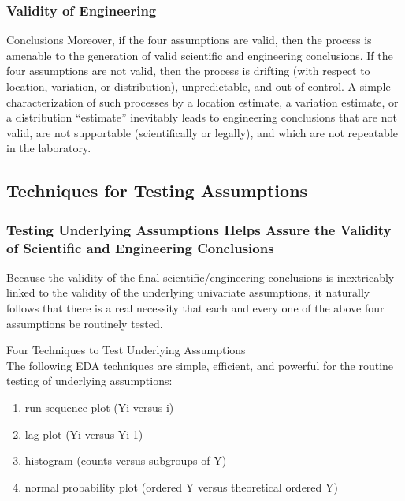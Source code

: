 \documentclass[]{book}
\providecommand{\tightlist}{%
  \setlength{\itemsep}{0pt}\setlength{\parskip}{0pt}}
\theoremstyle{definition}
\theoremstyle{definition}
\theoremstyle{definition}
\theoremstyle{remark}
\begin{document}
\subsubsection{Validity of Engineering}\label{validity-of-engineering}

Conclusions Moreover, if the four assumptions are valid, then the
process is amenable to the generation of valid scientific and
engineering conclusions. If the four assumptions are not valid, then the
process is drifting (with respect to location, variation, or
distribution), unpredictable, and out of control. A simple
characterization of such processes by a location estimate, a variation
estimate, or a distribution ``estimate'' inevitably leads to engineering
conclusions that are not valid, are not supportable (scientifically or
legally), and which are not repeatable in the laboratory.

\subsection{Techniques for Testing
Assumptions}\label{techniques-for-testing-assumptions}

\subsubsection{Testing Underlying Assumptions Helps Assure the Validity
of Scientific and Engineering
Conclusions}\label{testing-underlying-assumptions-helps-assure-the-validity-of-scientific-and-engineering-conclusions}

Because the validity of the final scientific/engineering conclusions is
inextricably linked to the validity of the underlying univariate
assumptions, it naturally follows that there is a real necessity that
each and every one of the above four assumptions be routinely tested.

Four Techniques to Test Underlying Assumptions\\
The following EDA techniques are simple, efficient, and powerful for the
routine testing of underlying assumptions:

\begin{enumerate}
\def\labelenumi{\arabic{enumi}.}
\tightlist
\item
  run sequence plot (Yi versus i)
\item
  lag plot (Yi versus Yi-1)
\item
  histogram (counts versus subgroups of Y)
\item
  normal probability plot (ordered Y versus theoretical ordered Y)
\end{enumerate}
\end{document}
